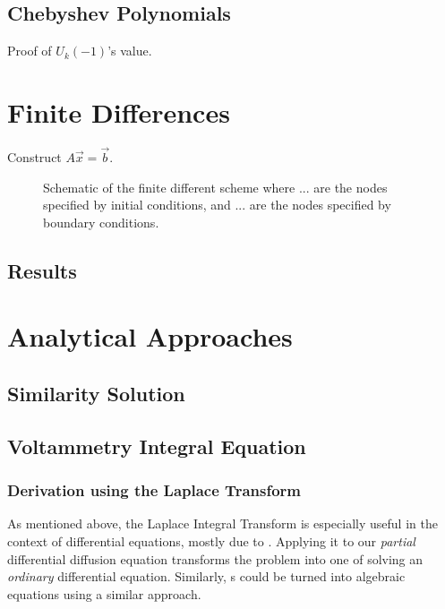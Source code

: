 \documentclass{prettytex/ox/mmsc-special-topic}
\begin{document}
  \subsection{Chebyshev Polynomials}
  Proof of $U_k(-1)$'s value.

  \section{Finite Differences}
  Construct $A \vec{x} = \vec{b}$.

  \begin{figure}[H]
    \centering
    \caption{Schematic of the finite different scheme where ... are the nodes specified by initial conditions, and ... are the nodes specified by boundary conditions.}
    \label{fig:fd-scheme}
  \end{figure}

  \subsection{Results}

  \section{Analytical Approaches}
  \subsection{Similarity Solution}
  \subsection{Voltammetry Integral Equation}
  \subsubsection{Derivation using the Laplace Transform}
  As mentioned above, the Laplace Integral Transform is especially useful in the context of differential equations, mostly due to .
  Applying it to our \textit{partial} differential diffusion equation  transforms the problem into one of solving an \textit{ordinary} differential equation.
  Similarly, s could be turned into algebraic equations using a similar approach.
\end{document}
